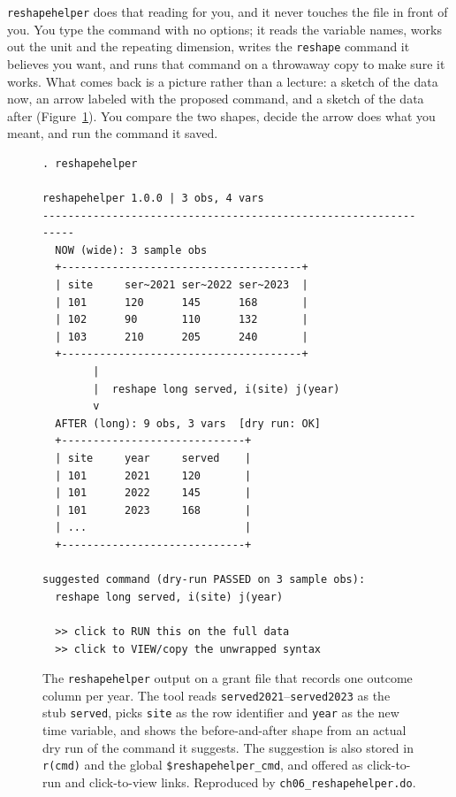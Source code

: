 \texttt{reshapehelper} does that reading for you, and it never touches the file in front of you. You type the command with no options; it reads the variable names, works out the unit and the repeating dimension, writes the \texttt{reshape} command it believes you want, and runs that command on a throwaway copy to make sure it works. What comes back is a picture rather than a lecture: a sketch of the data now, an arrow labeled with the proposed command, and a sketch of the data after (Figure~\ref{fig:reshapehelper}). You compare the two shapes, decide the arrow does what you meant, and run the command it saved.

\begin{figure}[htbp]
\centering
{\footnotesize
\begin{mdframed}[backgroundcolor=aeBg,linecolor=aeRule,linewidth=0.6pt,%
roundcorner=3pt,innertopmargin=5pt,innerbottommargin=5pt,%
innerleftmargin=7pt,innerrightmargin=7pt,nobreak=true]
\begin{verbatim}
. reshapehelper

reshapehelper 1.0.0 | 3 obs, 4 vars
----------------------------------------------------------------
  NOW (wide): 3 sample obs
  +--------------------------------------+
  | site     ser~2021 ser~2022 ser~2023  |
  | 101      120      145      168       |
  | 102      90       110      132       |
  | 103      210      205      240       |
  +--------------------------------------+
        |
        |  reshape long served, i(site) j(year)
        v
  AFTER (long): 9 obs, 3 vars  [dry run: OK]
  +-----------------------------+
  | site     year     served    |
  | 101      2021     120       |
  | 101      2022     145       |
  | 101      2023     168       |
  | ...                         |
  +-----------------------------+

suggested command (dry-run PASSED on 3 sample obs):
  reshape long served, i(site) j(year)

  >> click to RUN this on the full data
  >> click to VIEW/copy the unwrapped syntax
\end{verbatim}
\end{mdframed}
}
\caption[The reshapehelper diagnosis and suggestion]{The \texttt{reshapehelper} output on a grant file that records one outcome column per year. The tool reads \texttt{served2021}--\texttt{served2023} as the stub \texttt{served}, picks \texttt{site} as the row identifier and \texttt{year} as the new time variable, and shows the before-and-after shape from an actual dry run of the command it suggests. The suggestion is also stored in \texttt{r(cmd)} and the global \texttt{\$reshapehelper\_cmd}, and offered as click-to-run and click-to-view links. Reproduced by \texttt{ch06\_reshapehelper.do}.}
\label{fig:reshapehelper}
\end{figure}

